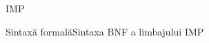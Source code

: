 \documentclass[xcolor=pdftex,romanian,colorlinks]{beamer}
\begin{document}
\begin{subsection}{IMP}
\begin{comment}
\alert{\renewcommand{\syntaxKeyword}{}\syntax[\Stmt]{\color{black}\Sif\;\terminal{(}\BExp\terminal{)}\Block\Selse\Block}{}
	\syntaxCont[\Stmt]{\color{black}\Id \terminal{:=}\AExp\terminal{;}}{}}
   \item Categorii sintactice (neterminale, încep cu majusculă)
   \begin{itemize}
    \item descriu tipurile de sintaxă
     \begin{itemize}
      \item Tipuri lexicale: %
	  \item Tipuri construite:
     \end{itemize}
   \end{itemize}
   \item Cuvinte cheie (terminale, încep cu literă mică sau simboluri)
   \begin{itemize}
    \item descriu elementele lexicale:
   $\Sif$, $\Selse$, $\Sint$,
   $\Swhile$,
   $\leq$,
   $\wedge$, $\neg$,
   $\terminal{+}$, $\terminal{:=}$, $\terminal{;}$, $\terminal{(}$, $\terminal{)}$, \ldots
   \end{itemize}
  \end{itemize}
 \end{frame}
\end{comment}
\begin{frame}{Sintaxă formală}{Sintaxa BNF a limbajului IMP}
\vspace{-5ex}
\end{frame}
\end{subsection}
\end{document}
